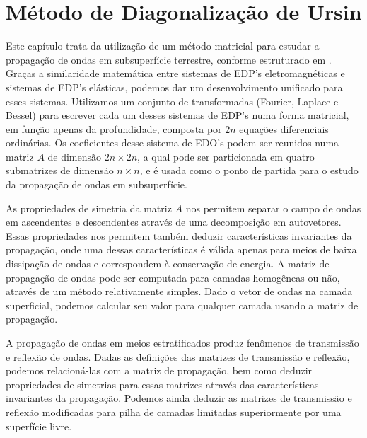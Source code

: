 \chapter{M\'etodo de Diagonaliza\c{c}\~ao de Ursin}\label{sec.diagonalizacao_ursin}

Este cap\'itulo trata da utiliza\c{c}\~ao de um m\'etodo matricial para estudar a propaga\c{c}\~ao de ondas em subsuperf\'icie terrestre, conforme estruturado em \cite{Ursin-1983}. Gra\c{c}as a similaridade matem\'atica entre sistemas de EDP's eletromagn\'eticas e sistemas de EDP's el\'asticas, podemos dar um desenvolvimento unificado para esses sistemas. Utilizamos um conjunto de transformadas (Fourier, Laplace e Bessel) para escrever cada um desses sistemas de EDP's numa forma matricial, em fun\c{c}\~ao apenas da profundidade, composta por $2n$ equa\c{c}\~oes diferenciais ordin\'arias. Os coeficientes desse sistema de EDO's podem ser reunidos numa matriz $A$ de dimens\~ao $2n\times 2n$, a qual pode ser particionada em quatro submatrizes de dimens\~ao $n\times n$, e \'e usada como o ponto de partida para o estudo da propaga\c{c}\~ao de ondas em subsuperf\'icie.  

As propriedades de simetria da matriz $A$ nos permitem separar o campo de ondas em ascendentes e descendentes atrav\'es de uma decomposi\c{c}\~ao em autovetores. Essas propriedades nos permitem tamb\'em deduzir caracter\'isticas invariantes da propaga\c{c}\~ao, onde uma dessas caracter\'isticas \'e v\'alida apenas para meios de baixa dissipa\c{c}\~ao de ondas e correspondem \`a conserva\c{c}\~ao de energia. A matriz de propaga\c{c}\~ao de ondas pode ser computada para camadas homog\^eneas ou n\~ao, atrav\'es de um m\'etodo relativamente simples. Dado o vetor de ondas na camada superficial, podemos calcular seu valor para qualquer camada usando a matriz de propaga\c{c}\~ao.

A propaga\c{c}\~ao de ondas em meios estratificados produz fen\^omenos de transmiss\~ao e reflex\~ao de ondas. Dadas as defini\c{c}\~oes das matrizes de transmiss\~ao e reflex\~ao, podemos relacion\'a-las com a matriz de propaga\c{c}\~ao, bem como deduzir propriedades de simetrias para essas matrizes atrav\'es das caracter\'isticas invariantes da propaga\c{c}\~ao. Podemos ainda deduzir as matrizes de transmiss\~ao e reflex\~ao modificadas para pilha de camadas limitadas superiormente por uma superf\'icie livre.

